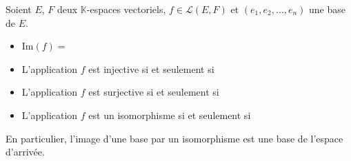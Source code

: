 \documentclass[french,11pt,twoside]{VcCours}
\begin{document}
\begin{Theoreme}{} 
	Soient $E$, $F$ deux $\mathbb{K}$-espaces vectoriels, $f \in \mathcal{L}(E,F)$
	et $(e_1, e_2, \ldots, e_n)$ une base de $E$.
\begin{itemize}
\item $\textrm{Im}(f) = \phantom{\textrm{Vect}(f(e_1), f(e_2), \ldots, f(e_n))}$
\item L'application $f$ est injective si et seulement si \\
		\phantom{$(f(e_1), f(e_2), \ldots, f(e_n))$ est une famille libre.}
\item L'application $f$ est surjective si et seulement si \\
		\phantom{$(f(e_1), f(e_2), \ldots, f(e_n))$ est une famille génératrice de $F$.}
\item L'application $f$ est un isomorphisme si et seulement si \\
		\phantom{$(f(e_1), f(e_2), \ldots, f(e_n))$ est une base.}
\end{itemize}
\end{Theoreme}

\begin{Remarque}{} 
	En particulier, l'image d'une base par un isomorphisme est une base de 
	l'espace d'arrivée.
\end{Remarque}
\end{document}
